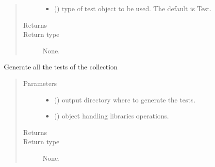 \documentclass[letterpaper,10pt,english]{sphinxmanual}
\begin{document}
\begin{fulllineitems}
\begin{quote}
\begin{description}
\begin{itemize}
\item {} 
\sphinxAtStartPar
{} ({\hyperref[\detokenize{api/inputgeneration:testrun.Test}]{}}\sphinxstyleliteralemphasis{\sphinxupquote{, }}) \textendash{} type of test object to be used. The default is Test.

\end{itemize}

\item[{Returns}] \leavevmode
\sphinxAtStartPar


\item[{Return type}] \leavevmode
\sphinxAtStartPar
None.

\end{description}\end{quote}

\begin{fulllineitems}
\label{\detokenize{api/inputgeneration:testrun.MultipleTest.generate_test}}
\sphinxAtStartPar
Generate all the tests of the collection
\begin{quote}\begin{description}
\item[{Parameters}] \leavevmode\begin{itemize}
\item {} 
\sphinxAtStartPar
{} () \textendash{} output directory where to generate the tests.

\item {} 
\sphinxAtStartPar
{} ({\hyperref[\detokenize{api/initobjects:libmanager.LibManager}]{}}) \textendash{} object handling libraries operations.

\end{itemize}

\item[{Returns}] \leavevmode
\sphinxAtStartPar


\item[{Return type}] \leavevmode
\sphinxAtStartPar
None.


\end{description}
\end{quote}
\end{fulllineitems}
\end{fulllineitems}
\end{document}
